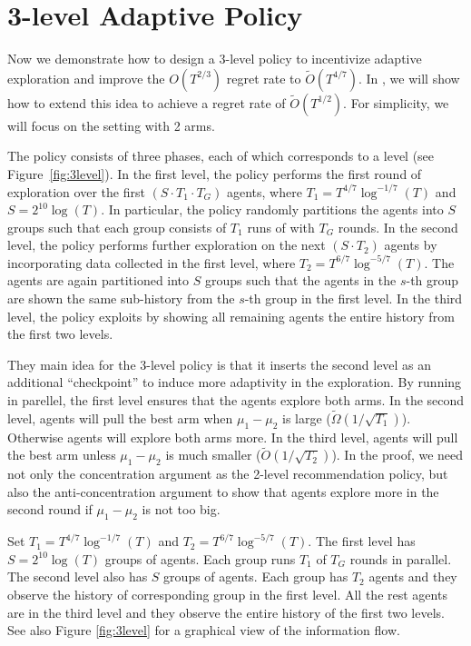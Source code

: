 
\section{3-level Adaptive Policy}
\label{sec:3level}
Now we demonstrate how to design a 3-level policy to incentivize
adaptive exploration and improve the $O(T^{2/3})$ regret rate to
$\tilde O(T^{4/7})$. In , we will show how to extend
this idea to achieve a regret rate of $\tilde O(T^{1/2})$. For
simplicity, we will focus on the setting with 2 arms.


The policy consists of three phases, each of which corresponds to a
level (see Figure~\ref{fig:3level}).  In the first level, the policy
performs the first round of exploration over the first
$(S\cdot T_1\cdot T_G)$ agents, where $T_1 = T^{4/7}\log^{-1/7}(T)$
and $S = 2^{10}\log(T)$. In particular, the policy randomly partitions
the agents into $S$ groups such that each group consists of $T_1$ runs
of \ALGG with $T_G$ rounds. In the second level, the policy performs
further exploration on the next $(S\cdot T_2)$ agents by incorporating
data collected in the first level, where
$T_2 = T^{6/7}\log^{-5/7}(T)$. The agents are again partitioned into
$S$ groups such that the agents in the $s$-th group are shown the same
sub-history from the $s$-th group in the first level. In the third
level, the policy exploits by showing all remaining agents the entire
history from the first two levels.


They main idea for the 3-level policy is that it inserts the second
level as an additional ``checkpoint'' to induce more adaptivity in the
exploration. By running \ALGG in parellel, the first level ensures
that the agents explore both arms. In the second level, agents will
pull the best arm when $\mu_1 - \mu_2$ is large
($\tilde{\Omega}(1/\sqrt{T_1})$). Otherwise agents will explore both
arms more. In the third level, agents will pull the best arm unless
$\mu_1-\mu_2$ is much smaller ($\tilde{O}(1/\sqrt{T_2})$). In the
proof, we need not only the concentration argument as the 2-level
recommendation policy, but also the anti-concentration argument to
show that agents explore more in the second round if $\mu_1-\mu_2$ is
not too big.


\iffalse
Set $T_1 = T^{4/7}\log^{-1/7}(T)$ and $T_2 =
T^{6/7}\log^{-5/7}(T)$. The first level has $S = 2^{10}\log(T)$ groups
of agents. Each group runs $T_1$ \ALGG of $T_G$ rounds in
parallel. The second level also has $S$ groups of agents. Each group
has $T_2$ agents and they observe the history of corresponding group
in the first level. All the rest agents are in the third level and
they observe the entire history of the first two levels.  See also
Figure \ref{fig:3level} for a graphical view of the information flow.



